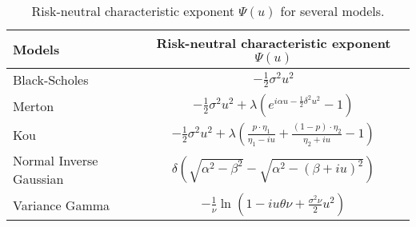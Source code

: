 \begin{table}[!ht]
\centering
  \begin{tabular}{l|c}
    \toprule
    Models & Risk-neutral characteristic exponent $\Psi(u)$ \\
    \toprule
   Black-Scholes & $-\frac{1}{2}\sigma^2u^2$ \\
   \midrule
   Merton & $-\frac{1}{2}\sigma^2 u^2 + \lambda\left(e^{i\alpha u -\frac{1}{2}\delta^2 u^2}-1\right)$\\
   Kou & $-\frac{1}{2}\sigma^2 u^2 +\lambda\left(\frac{p\cdot\eta_1}{\eta_1-iu}+\frac{(1-p)\cdot\eta_2}{\eta_2+iu}-1\right)$\\
   \midrule
   Normal Inverse Gaussian & $\delta \left(\sqrt{\alpha^2-\beta^2}-\sqrt{\alpha^2-(\beta+iu)^2}\right)$\\
   Variance Gamma &$-\frac{1}{\nu}\ln\left(1-iu\theta\nu+\frac{\sigma^2\nu}{2}u^2\right)$ \\
    \bottomrule
  \end{tabular}
  \vspace{5pt}
  \caption{\label{tab:rn_ce} Risk-neutral characteristic exponent $\Psi(u)$ for several models.}
\end{table}
